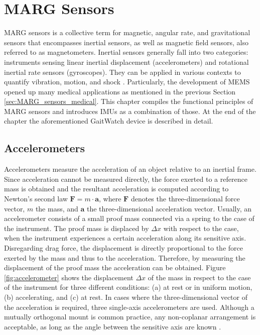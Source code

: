 \chapter{MARG Sensors}
\label{ch:MARG}

MARG sensors is a collective term for magnetic, angular rate, and gravitational sensors that encompasses inertial sensors, as well as magnetic field sensors, also referred to as magnetometers. Inertial sensors generally fall into two categories: instruments sensing linear inertial displacement (accelerometers) and rotational inertial rate sensors (gyroscopes). They can be applied in various contexts to quantify vibration, motion, and shock \cite{bhattacharyya_inertial_sensors_applications_13}. Particularly, the development of \gls{MEMS} opened up many medical applications as mentioned in the previous Section \ref{sec:MARG_sensors_medical}. This chapter compiles the functional principles of MARG sensors and introduces \glspl{IMU} as a combination of those. At the end of the chapter the aforementioned GaitWatch device is described in detail.

\section{Accelerometers}

Accelerometers measure the acceleration of an object relative to an inertial frame. Since acceleration cannot be measured directly, the force exerted to a reference mass is obtained and the resultant acceleration is computed according to Newton's second law $\mathbf{F} = m \cdot \mathbf{a}$, where $ \mathbf{F}$ denotes the three-dimensional force vector, $m$ the mass, and $\mathbf{a}$ the three-dimensional acceleration vector. Usually, an accelerometer consists of a small proof mass connected via a spring to the case of the instrument. The proof mass is displaced  by $\Delta x$ with respect to the case, when the instrument experiences a certain acceleration along its sensitive axis. Disregarding drag force, the displacement is directly proportional to the force exerted by the mass and thus to the acceleration. Therefore, by measuring the displacement of the proof mass the acceleration can be obtained. Figure \ref{fig:accelerometer} shows the displacement $\Delta x$ of the mass in respect to the case of the instrument for three different conditions: (a) at rest or in uniform motion, (b) accelerating, and (c) at rest. In cases where the three-dimensional vector of the acceleration is required, three single-axis accelerometers are used. Although a mutually orthogonal mount is common practice, any non-coplanar arrangement is acceptable, as long as the angle between the sensitive axis are known \cite{bhattacharyya_inertial_sensors_applications_13}.


